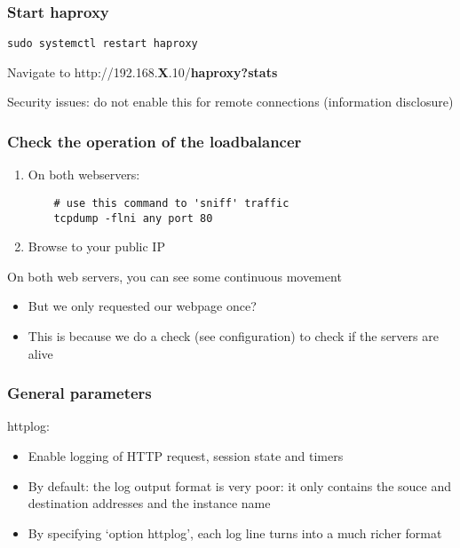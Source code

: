 \documentclass{article}
\begin{document}
\subsubsection{Start haproxy}

\begin{verbatim}
sudo systemctl restart haproxy
\end{verbatim}

Navigate to http://192.168.\textbf{X}.10/\textbf{haproxy?stats}

Security issues: do not enable this for remote connections (information disclosure)

\subsubsection{Check the operation of the loadbalancer}

\begin{enumerate}
    \item On both webservers: 
\begin{verbatim}
    # use this command to 'sniff' traffic
    tcpdump -flni any port 80
\end{verbatim}
    \item Browse to your public IP
\end{enumerate}

On both web servers, you can see some continuous movement

\begin{itemize}
    \item But we only requested our webpage once?
    \item This is because we do a check (see configuration) to check if the servers are alive
\end{itemize}

\subsubsection{General parameters}

httplog:

\begin{itemize}
    \item Enable logging of HTTP request, session state and timers
    \item By default: the log output format is very poor: it only contains the souce and destination addresses and the instance name
    \item By specifying `option httplog', each log line turns into a much richer format
\end{itemize}
\end{document}
